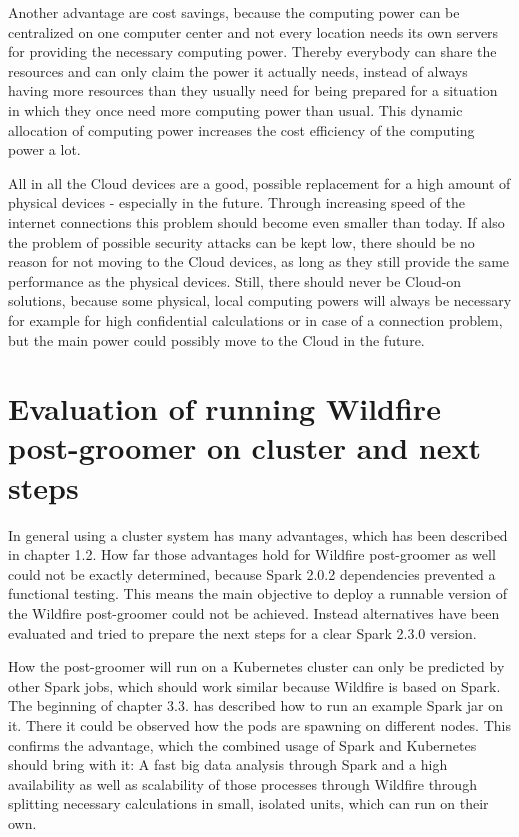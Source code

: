 Another advantage are cost savings, because the computing power can be centralized on one computer center and not every location needs its own servers for providing the necessary computing power. Thereby everybody can share the resources and can only claim the power it actually needs, instead of always having more resources than they usually need for being prepared for a situation in which they once need more computing power than usual. This dynamic allocation of computing power increases the cost efficiency of the computing power a lot.

All in all the Cloud devices are a good, possible replacement for a high amount of physical devices - especially in the future. Through increasing speed of the internet connections this problem should become even smaller than today. If also the problem of possible security attacks can be kept low, there should be no reason for not moving to the Cloud devices, as long as they still provide the same performance as the physical devices. Still, there should never be Cloud-on solutions, because some physical, local computing powers will always be necessary for example for high confidential calculations or in case of a connection problem, but the main power could possibly move to the Cloud in the future.

\section{Evaluation of running Wildfire post-groomer on cluster and next steps}

In general using a cluster system has many advantages, which has been described in chapter 1.2. How far those advantages hold for Wildfire post-groomer as well could not be exactly determined, because Spark 2.0.2 dependencies prevented a functional testing. This means the main objective to deploy a runnable version of the Wildfire post-groomer could not be achieved. Instead alternatives have been evaluated and tried to prepare the next steps for a clear Spark 2.3.0 version.

How the post-groomer will run on a Kubernetes cluster can only be predicted by other Spark jobs, which should work similar because Wildfire is based on Spark. The beginning of chapter 3.3. has described how to run an example Spark jar on it. There it could be observed how the pods are spawning on different nodes. This confirms the advantage, which the combined usage of Spark and Kubernetes should bring with it: A fast big data analysis through Spark and a high availability as well as scalability of those processes through Wildfire through splitting necessary calculations in small, isolated units, which can run on their own.

